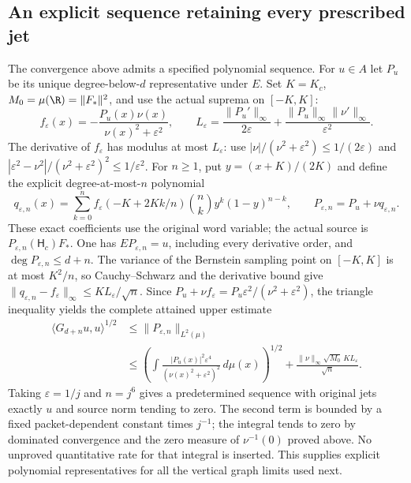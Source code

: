 \documentclass[11pt,a4paper]{article}
\theoremstyle{definition}\newtheorem{definition}[theorem]{Definition}
\begin{document}
\subsection{An explicit sequence retaining every prescribed jet}
The convergence above admits a specified polynomial sequence.
For $u\in A$ let $P_u$ be its unique degree-below-$d$ representative
under $E$. Set $K=K_c$, $M_0=\mu(\R)=\|F_*\|^2$, and use the
actual suprema on $[-K,K]$:
\[
 f_\varepsilon(x)=-\frac{P_u(x)\nu(x)}{\nu(x)^2+\varepsilon^2},
 \qquad
 L_\varepsilon=
 \frac{\|P_u'\|_\infty}{2\varepsilon}
       +\frac{\|P_u\|_\infty\|\nu'\|_\infty}{\varepsilon^2}.
 \tag{GC13}\label{gc:regularized-inverse}
\]
The derivative of $f_\varepsilon$ has modulus at most
$L_\varepsilon$: use
$|\nu|/(\nu^2+\varepsilon^2)\le1/(2\varepsilon)$ and
$|\varepsilon^2-\nu^2|/(\nu^2+\varepsilon^2)^2\le1/\varepsilon^2$.
For $n\ge1$, put $y=(x+K)/(2K)$ and define the explicit
degree-at-most-$n$ polynomial
\[
 q_{\varepsilon,n}(x)=\sum_{k=0}^n
 f_\varepsilon(-K+2Kk/n)\binom nk y^k(1-y)^{n-k},
 \qquad P_{\varepsilon,n}=P_u+\nu q_{\varepsilon,n}.
 \tag{GC14}\label{gc:constructive-sequence}
\]
These exact coefficients use the original word variable; the
actual source is $P_{\varepsilon,n}(\mathsf H_c)F_*$.
One has $E P_{\varepsilon,n}=u$, including every derivative order,
and $\deg P_{\varepsilon,n}\le d+n$.
The variance of the Bernstein sampling point on $[-K,K]$ is
at most $K^2/n$, so Cauchy--Schwarz and the derivative bound give
$\|q_{\varepsilon,n}-f_\varepsilon\|_\infty
\le K L_\varepsilon/\sqrt n$.
Since $P_u+\nu f_\varepsilon=P_u\varepsilon^2/
(\nu^2+\varepsilon^2)$, the triangle inequality yields the
complete attained upper estimate
\[
 \begin{split}
 \langle G_{d+n}u,u\rangle^{1/2}
 &\le\|P_{\varepsilon,n}\|_{L^2(\mu)}\\
 &\le\left(\int
       \frac{|P_u(x)|^2\varepsilon^4}
            {(\nu(x)^2+\varepsilon^2)^2}\,d\mu(x)\right)^{1/2}
       +\frac{\|\nu\|_\infty\sqrt{M_0}\,K L_\varepsilon}{\sqrt n}.
 \end{split}
 \tag{GC15}\label{gc:constructive-bound}
\]
Taking $\varepsilon=1/j$ and $n=j^6$ gives a predetermined
sequence with original jets exactly $u$ and source norm tending
to zero. The second term is bounded by a fixed packet-dependent
constant times $j^{-1}$; the integral tends to zero by dominated
convergence and the zero measure of $\nu^{-1}(0)$ proved above.
No unproved quantitative rate for that integral is inserted.
This supplies explicit polynomial representatives for all the
vertical graph limits used next.
\end{document}
